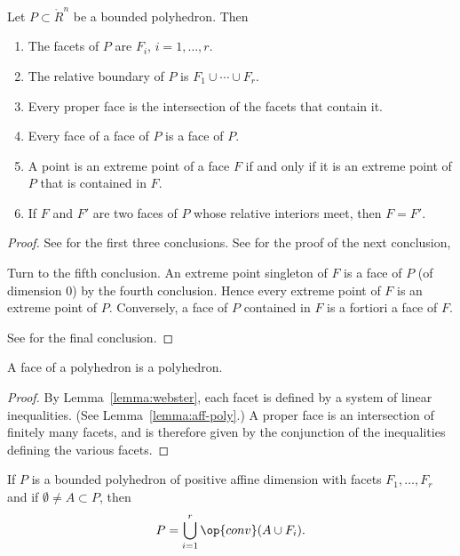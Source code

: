 \begin{lemma}[]\label{lemma:webster}  
Let $P\subset\ring{R}^n$ be a bounded polyhedron.  Then
%
\begin{enumerate}
\item The facets of $P$ are $F_i$, $i=1,\ldots,r$.
\item The relative boundary of $P$ is $F_1\cup\cdots \cup F_r$.
\item Every proper face is the intersection of the facets that contain it.
\item Every face of a face of $P$ is a face of $P$.
\item A point is an extreme point of a face $F$ if and only if it is an extreme point of $P$
that is contained in $F$.
\item If $F$ and $F'$ are two faces of $P$ whose relative interiors
meet, then $F=F'$.
\end{enumerate}
\end{lemma}
%
%
%

\begin{proof} See \cite[Thm~3.2.1]{webster:1994} for the first three
conclusions.  See \cite[Th~2.6.5]{webster:1994} for the proof of the
next conclusion,

Turn to the fifth conclusion.  An extreme point singleton of $F$ is a face of $P$ (of
dimension $0$) by the fourth conclusion.  Hence every extreme point of $F$
is an extreme point of $P$.  Conversely, a face of $P$ contained in $F$ is a
fortiori a face of $F$.

See \cite[Cor~2.6.7]{webster:1994} for the final conclusion.
\end{proof}

\begin{corollary}
A face of a polyhedron is a polyhedron.  
\end{corollary}

\begin{proof} By Lemma~\ref{lemma:webster}, each facet is defined by a
system of linear inequalities.  (See Lemma~\ref{lemma:aff-poly}.)  A
proper face is an intersection of finitely many facets, and is
therefore given by the conjunction of the inequalities defining the
various facets.
\end{proof}

\begin{lemma}[]\label{lemma:facet-partition}
  If $P$ is a bounded polyhedron of positive affine dimension with
  facets $F_1,\ldots,F_r$ and if $\emptyset\ne A\subset P$, then
\begin{displaymath}
P = \bigcup_{i=1}^r \op{conv}(A\cup F_i).
\end{displaymath}
\end{lemma}

